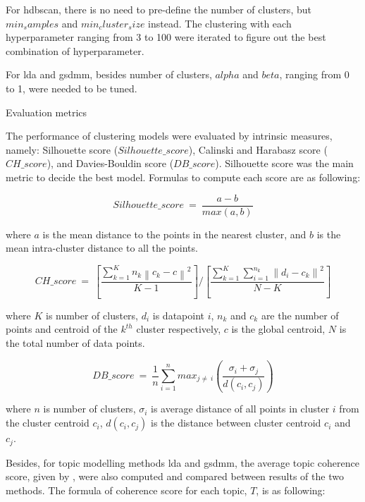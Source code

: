 \documentclass[a4paper,man,floatsintext,natbib,noextraspace]{apa6}
\makeatletter
\renewcommand{\subsubsection}{\@startsection{subsubsection}{3}
  {\z@}
  {\b@level@two@skip}
  {\e@level@two@skip}
  {\normalfont\normalsize\bfseries\itshape}}
\makeatother
\begin{document}
For \gls{hdbscan}, there is no need to pre-define the number of clusters, but $min_samples$ and $min_cluster_size$ instead. The clustering with each hyperparameter ranging from 3 to 100 were iterated to figure out the best combination of hyperparameter.

For \gls{lda} and \gls{gsdmm}, besides number of clusters, $alpha$ and $beta$, ranging from 0 to 1, were needed to be tuned.

\subsubsection{Evaluation metrics}

The performance of clustering models were evaluated by intrinsic measures, namely: Silhouette score ($Silhouette\_score$), Calinski and Harabasz score ($CH\_score$), and Davies-Bouldin score ($DB\_score$). Silhouette score was the main metric to decide the best model. Formulas to compute each score are as following:

\begin{equation} \label{eq:silhouette}
    Silhouette\_score\:=\:\frac{a-b}{max(a,b)}
\end{equation}

where $a$ is the mean distance to the points in the nearest cluster, and $b$ is the mean intra-cluster distance to all the points.

\begin{equation}
    CH\_score\:=\:\left[\frac{\sum_{k=1}^{K} n_{k}\left\|c_{k}-c\right\|^{2}}{K-1}\right] / \left[\frac{\sum_{k=1}^{K} \sum_{i=1}^{n_{k}}\left\|d_{i}-c_{k}\right\|^{2}}{N-K}\right]
\end{equation}

where $K$ is number of clusters, $d_{i}$ is datapoint $i$, $n_{k}$ and $c_{k}$ are the number of points and centroid of the $k^{th}$ cluster respectively, $c$ is the global centroid, $N$ is the total number of data points.

\begin{equation} \label{eq:db_score}
    DB\_score\:=\:\frac{1}{n}\sum\limits_{i=1}^n max_{j\neq\:i}(\frac{\sigma_{i}+\sigma_{j}}{d(c_{i},c_{j})})
\end{equation}

where $n$ is number of clusters, $\sigma_{i}$ is average distance of all points in cluster $𝑖$ from the cluster centroid $c_{i}$, $d(c_{i},c_{j})$ is the distance between cluster centroid $c_{i}$ and $c_{j}$.

Besides, for topic modelling methods \gls{lda} and \gls{gsdmm}, the average topic coherence score, given by \cite{mazaruraGammaPoissonMixtureTopic2020b}, were also computed and compared between results of the two methods. The formula of coherence score for each topic, $T$, is as following:
\end{document}
